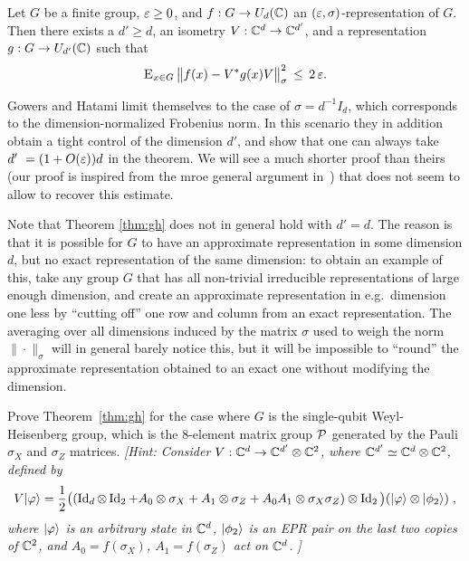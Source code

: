 \begin{theorem}\label{thm:gh}
Let $G$ be a finite group, $\varepsilon\geq 0$, and $f:G\to U_d(\mathbb{C})$ an $(\varepsilon,\sigma)$-representation of $G$. Then there exists a $d'\geq d$, an isometry $V:\mathbb{C}^d\to \mathbb{C}^{d'}$, and a representation $g:G\to U_{d'}(\mathbb{C})$ such that 
$$\textsc{E}_{x\in G}\, \big\| f(x) - V^*g(x)V \big\|_\sigma^2\, \leq\, 2\,\varepsilon.$$ 
\end{theorem}

Gowers and Hatami limit themselves to the case of $\sigma = d^{-1}I_d$, which corresponds to the dimension-normalized Frobenius norm. In this scenario they in addition obtain a tight control of the dimension $d'$, and show that one can always take $d'\ = (1+O(\varepsilon))d$ in the theorem. We will see a much shorter proof than theirs (our proof is inspired from the mroe general argument in~\cite{de2017operator}) that does not seem to allow to recover this estimate. 

Note that  Theorem \ref{thm:gh} does not in general hold  with $d'=d$. The reason is that it is possible for $G$ to have an approximate representation in some dimension $d$, but no exact representation of the same dimension: to obtain an example of this, take any group $G$ that has all non-trivial irreducible representations of large enough dimension, and create an approximate representation in e.g.\ dimension one less by ``cutting off'' one row and column from an exact representation. The averaging over all dimensions induced by the matrix $\sigma$ used to weigh the norm $\|\cdot\|_\sigma$ will in general barely notice this, but it will be impossible to ``round'' the approximate representation obtained to an exact one without modifying the dimension. 

\begin{exercise}\label{ex:gh-pauli}
Prove Theorem~\ref{thm:gh} for the case where $G$ is the single-qubit Weyl-Heisenberg group, which is the $8$-element matrix group $\mathcal{P}$ generated by the Pauli $\sigma_X$ and $\sigma_Z$ matrices. \emph{[Hint: Consider $V:\mathbb{C}^d \to \mathbb{C}^{d'} \otimes \mathbb{C}^2$, where $\mathbb{C}^{d'} \simeq \mathbb{C}^d \otimes \mathbb{C}^2 $, defined by 
$$V|\varphi\rangle = \frac{1}{2}\big((\mathop{\rm Id}\nolimits_d\otimes \mathop{\rm Id}\nolimits_2 + A_0 \otimes \sigma_X + A_1 \otimes \sigma_Z + A_0A_1 \otimes \sigma_X\sigma_Z)\otimes \mathop{\rm Id}\nolimits_2 \big)(|\varphi\rangle \otimes |\phi_2\rangle)\;,$$
where $|\varphi\rangle$ is an arbitrary state in $\mathbb{C}^d$, $|\phi_2\rangle$ is an EPR pair on the last two copies of $\mathbb{C}^2$, and $A_0=f(\sigma_X)$, $A_1=f(\sigma_Z)$ act on $\mathbb{C}^d$. 
 ]}
\end{exercise}

